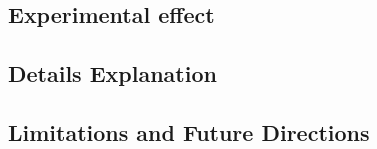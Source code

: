 \subsection{Experimental effect}


\subsection{Details Explanation}


\subsection{Limitations and Future Directions}

